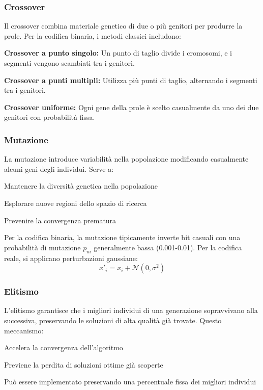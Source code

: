 \subsubsection{Crossover}
Il crossover combina materiale genetico di due o più genitori per produrre la prole. Per la codifica binaria, i metodi classici includono:
\begin{compactitemize}
    \item \textbf{Crossover a punto singolo:} Un punto di taglio divide i cromosomi, e i segmenti vengono scambiati tra i genitori.

    \item \textbf{Crossover a punti multipli:} Utilizza più punti di taglio, alternando i segmenti tra i genitori.

    \item \textbf{Crossover uniforme:} Ogni gene della prole è scelto casualmente da uno dei due genitori con probabilità fissa.
\end{compactitemize}

\subsubsection{Mutazione}
La mutazione introduce variabilità nella popolazione modificando casualmente alcuni geni degli individui. Serve a:
\begin{compactitemize}
\item Mantenere la diversità genetica nella popolazione
\item Esplorare nuove regioni dello spazio di ricerca
\item Prevenire la convergenza prematura
\end{compactitemize}

Per la codifica binaria, la mutazione tipicamente inverte bit casuali con una probabilità di mutazione $p_m$ generalmente bassa (0.001-0.01). Per la codifica reale, si applicano perturbazioni gaussiane:
\[
x'_i = x_i + \mathcal{N}(0, \sigma^2)
\]

\subsubsection{Elitismo}
L'elitismo garantisce che i migliori individui di una generazione sopravvivano alla successiva, preservando le soluzioni di alta qualità già trovate. Questo meccanismo:
\begin{compactitemize}
\item Accelera la convergenza dell'algoritmo
\item Previene la perdita di soluzioni ottime già scoperte
\item Può essere implementato preservando una percentuale fissa dei migliori individui
\end{compactitemize}

